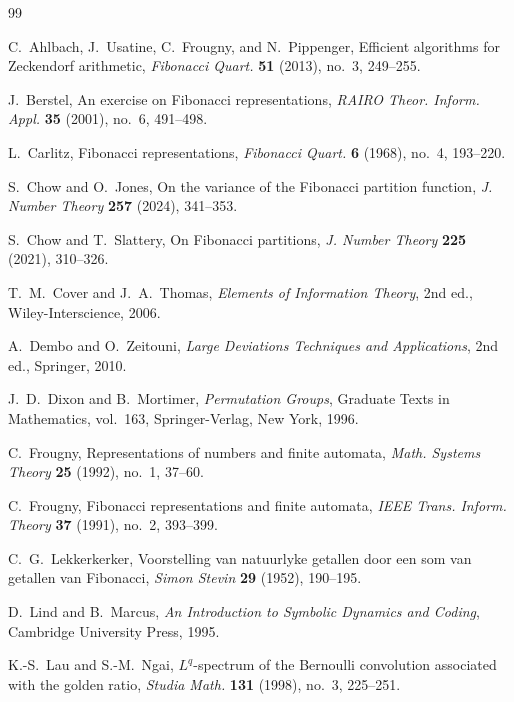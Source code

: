 \begin{thebibliography}{99}

C.~Ahlbach, J.~Usatine, C.~Frougny, and N.~Pippenger,
Efficient algorithms for Zeckendorf arithmetic,
\textit{Fibonacci Quart.} \textbf{51} (2013), no.~3, 249--255.

J.~Berstel,
An exercise on Fibonacci representations,
\textit{RAIRO Theor. Inform. Appl.} \textbf{35} (2001), no.~6, 491--498.

L.~Carlitz,
Fibonacci representations,
\textit{Fibonacci Quart.} \textbf{6} (1968), no.~4, 193--220.

S.~Chow and O.~Jones,
On the variance of the Fibonacci partition function,
\textit{J. Number Theory} \textbf{257} (2024), 341--353.

S.~Chow and T.~Slattery,
On Fibonacci partitions,
\textit{J. Number Theory} \textbf{225} (2021), 310--326.

T.~M.~Cover and J.~A.~Thomas,
\textit{Elements of Information Theory},
2nd ed., Wiley-Interscience, 2006.

A.~Dembo and O.~Zeitouni,
\textit{Large Deviations Techniques and Applications},
2nd ed., Springer, 2010.

J.~D.~Dixon and B.~Mortimer,
\textit{Permutation Groups},
Graduate Texts in Mathematics, vol.~163, Springer-Verlag, New York, 1996.

C.~Frougny,
Representations of numbers and finite automata,
\textit{Math. Systems Theory} \textbf{25} (1992), no.~1, 37--60.

C.~Frougny,
Fibonacci representations and finite automata,
\textit{IEEE Trans. Inform. Theory} \textbf{37} (1991), no.~2, 393--399.

C.~G.~Lekkerkerker,
Voorstelling van natuurlyke getallen door een som van getallen van Fibonacci,
\textit{Simon Stevin} \textbf{29} (1952), 190--195.

D.~Lind and B.~Marcus,
\textit{An Introduction to Symbolic Dynamics and Coding},
Cambridge University Press, 1995.

K.-S.~Lau and S.-M.~Ngai,
\(L^q\)-spectrum of the Bernoulli convolution associated with the golden ratio,
\textit{Studia Math.} \textbf{131} (1998), no.~3, 225--251.


\end{thebibliography}
